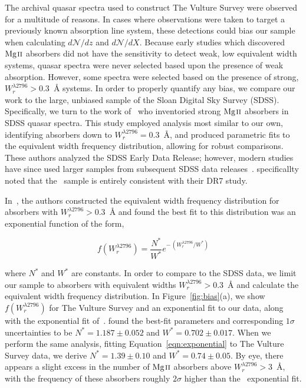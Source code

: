 The archival quasar spectra used to construct The Vulture Survey were observed for a multitude of reasons. In cases where observations were taken to target a previously known absorption line system, these detections could bias our sample when calculating $d\mathcal{N}\!/dz$ and $d\mathcal{N}\!/dX$. Because early studies which discovered ${\hbox{{\rm Mg}\kern 0.1em{\sc ii}}}$ absorbers did not have the sensitivity to detect weak, low equivalent width systems, quasar spectra were never selected based upon the presence of weak absorption. However, some spectra were selected based on the presence of strong, $W_r^{\lambda2796} > 0.3$~{\AA} systems. In order to properly quantify any bias, we compare our work to the large, unbiased sample of the Sloan Digital Sky Survey (SDSS). Specifically, we turn to the work of~\cite{Nestor2005} who inventoried strong ${\hbox{{\rm Mg}\kern 0.1em{\sc ii}}}$ absorbers in SDSS quasar spectra. This study employed analysis most similar to our own, identifying absorbers down to $W_r^{\lambda2796} = 0.3$~{\AA}, and produced parametric fits to the equivalent width frequency distribution, allowing for robust comparisons. These authors analyzed the SDSS Early Data Release; however, modern studies have since used larger samples from subsequent SDSS data releases~\citep{Prochter2006,Lundgren2009,Quider2011,Seyffert2013,Zhu2013,Raghunathan2016}. \cite{Zhu2013} specificallty noted that the~\cite{Nestor2005} sample is entirely consistent with their DR7 study.

In~\cite{Nestor2005}, the authors constructed the equivalent width frequency distribution for absorbers with $W_r^{\lambda2796} > 0.3$~{\AA} and found the best fit to this distribution was an exponential function of the form,

\begin{equation}
f(W_r^{\lambda2796}) = \frac{N^*}{W^*} e^{-\,\left(W_r^{\lambda2796} / W^*\right)}
\label{eqn:exponential}
\end{equation}

\noindent where $N^*$ and $W^*$ are constants. In order to compare to the SDSS data, we limit our sample to absorbers with equivalent widths $W_r^{\lambda2796} > 0.3$~{\AA} and calculate the equivalent width frequency distribution. In Figure~\ref{fig:bias}(a), we show $f(W_r^{\lambda2796})$ for The Vulture Survey and an exponential fit to our data, along with the exponential fit of~\cite{Nestor2005}. \cite{Nestor2005} found the best-fit parameters and corresponding $1\sigma$ uncertainties to be $N^* = 1.187 \pm 0.052$ and $W^* = 0.702 \pm 0.017$. When we perform the same analysis, fitting Equation~\ref{eqn:exponential} to The Vulture Survey data, we derive $N^* = 1.39 \pm 0.10$ and $W^* = 0.74 \pm 0.05$. By eye, there appears a slight excess in the number of ${\hbox{{\rm Mg}\kern 0.1em{\sc ii}}}$ absorbers above $W_r^{\lambda2796} > 3$~{\AA}, with the frequency of these absorbers roughly $2\sigma$ higher than the~\cite{Nestor2005} exponential fit.

